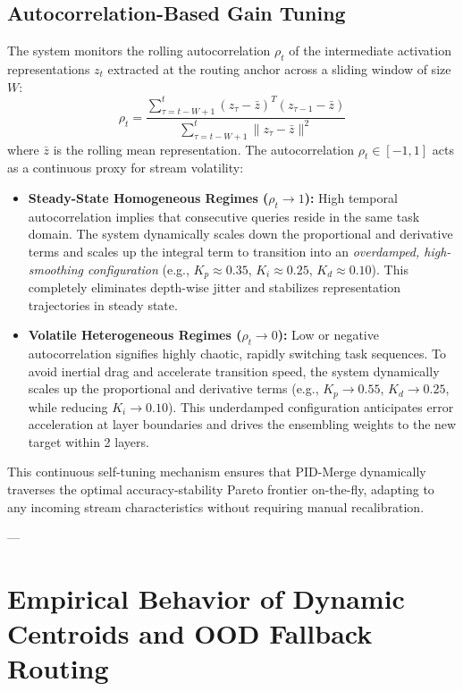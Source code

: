 \subsection{Autocorrelation-Based Gain Tuning}
The system monitors the rolling autocorrelation $\rho_t$ of the intermediate activation representations $z_t$ extracted at the routing anchor across a sliding window of size $W$:
\begin{equation}
\rho_t = \frac{\sum_{\tau = t-W+1}^{t} (z_{\tau} - \bar{z})^T (z_{\tau-1} - \bar{z})}{\sum_{\tau = t-W+1}^t \|z_{\tau} - \bar{z}\|^2}
\end{equation}
where $\bar{z}$ is the rolling mean representation. The autocorrelation $\rho_t \in [-1, 1]$ acts as a continuous proxy for stream volatility:
\begin{itemize}
    \item \textbf{Steady-State Homogeneous Regimes ($\rho_t \to 1$):} High temporal autocorrelation implies that consecutive queries reside in the same task domain. The system dynamically scales down the proportional and derivative terms and scales up the integral term to transition into an \emph{overdamped, high-smoothing configuration} (e.g., $K_p \approx 0.35$, $K_i \approx 0.25$, $K_d \approx 0.10$). This completely eliminates depth-wise jitter and stabilizes representation trajectories in steady state.
    \item \textbf{Volatile Heterogeneous Regimes ($\rho_t \to 0$):} Low or negative autocorrelation signifies highly chaotic, rapidly switching task sequences. To avoid inertial drag and accelerate transition speed, the system dynamically scales up the proportional and derivative terms (e.g., $K_p \to 0.55$, $K_d \to 0.25$, while reducing $K_i \to 0.10$). This underdamped configuration anticipates error acceleration at layer boundaries and drives the ensembling weights to the new target within 2 layers.
\end{itemize}

This continuous self-tuning mechanism ensures that PID-Merge dynamically traverses the optimal accuracy-stability Pareto frontier on-the-fly, adapting to any incoming stream characteristics without requiring manual recalibration.

---

\section{Empirical Behavior of Dynamic Centroids and OOD Fallback Routing}
\label{sec:appendix_ood_experiments}


